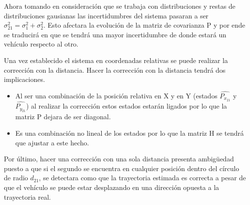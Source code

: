 Ahora tomando en consideración que se trabaja con distribuciones y restas de distribuciones gausianas las incertidumbres del sistema pasaran a ser $\sigma_{21}^2=\sigma_{1}^2+\sigma_{2}^2$. Esto afectara la evolución de la matriz de covarianza P y por ende se traducirá en que se tendrá una mayor incertidumbre de donde estará un vehículo respecto al otro. 
\par
Una vez establecido el sistema en coordenadas relativas se puede realizar la corrección con la distancia. Hacer la corrección con la distancia tendrá dos implicaciones.
\begin{itemize}
	\item Al ser una combinación de la posición relativa en X y en Y (estados $\hat{P_{x_{21}}}$ y $\hat{P_{y_{21}}}$) al realizar la corrección estos estados estarán ligados por lo que la matriz P dejara de ser diagonal. 
	\item Es una combinación no lineal de los estados por lo que la matriz H se tendrá que ajustar a este hecho. 
\end{itemize}
Por último, hacer una corrección con una sola distancia presenta ambigüedad puesto a que si el segundo se encuentra en cualquier posición dentro del círculo de radio $d_{21}$, se detectara como que la trayectoria estimada es correcta a pesar de que el vehículo se puede estar desplazando en una dirección opuesta a la trayectoria real. 

